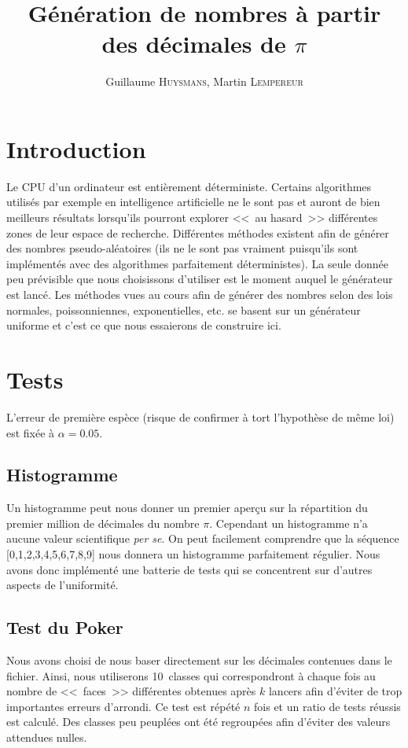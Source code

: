 \documentclass[12pt,a4paper]{article}
\author{Guillaume \textsc{Huysmans}, Martin \textsc{Lempereur}}
\title{Génération de nombres à partir des décimales de $\pi$}
\begin{document}
\maketitle

\section{Introduction}
Le CPU d'un ordinateur est entièrement déterministe. Certains algorithmes
utilisés par exemple en intelligence artificielle ne le sont pas et auront de
bien meilleurs résultats lorsqu'ils pourront explorer <<~au hasard~>> différentes
zones de leur espace de recherche. Différentes méthodes existent afin de générer
des nombres pseudo-aléatoires (ils ne le sont pas vraiment puisqu'ils sont
implémentés avec des algorithmes parfaitement déterministes). La seule donnée
peu prévisible que nous choisissons d'utiliser est le moment auquel le générateur
est lancé.
Les méthodes vues au cours afin de générer des nombres selon des lois normales,
poissonniennes, exponentielles, etc. se basent sur un générateur uniforme et
c'est ce que nous essaierons de construire ici. 

\section{Tests}
L'erreur de première espèce (risque de confirmer à tort l'hypothèse de même loi)
est fixée à $\alpha=0.05$.

\subsection{Histogramme}
Un histogramme peut nous donner un premier aperçu sur la répartition
du premier million de décimales du nombre $\pi$.
Cependant un histogramme n'a aucune valeur scientifique \textit{per se}. 
On peut facilement comprendre que la séquence [0,1,2,3,4,5,6,7,8,9]
nous donnera un histogramme parfaitement régulier.
Nous avons donc implémenté une batterie de tests qui se concentrent sur d'autres aspects de l'uniformité.


\subsection{Test du Poker}
Nous avons choisi de nous baser directement sur les décimales contenues
dans le fichier. Ainsi, nous utiliserons 10~classes qui correspondront
à chaque fois au nombre de <<~faces~>> différentes obtenues
après $k$ lancers afin d'éviter de trop importantes erreurs d'arrondi.
Ce test est répété $n$ fois et un ratio de tests réussis est calculé.
Des classes peu peuplées ont été regroupées afin d'éviter
des valeurs attendues nulles.
\end{document}
